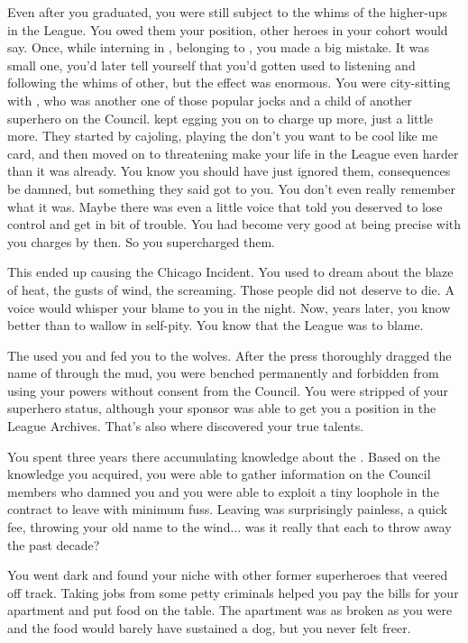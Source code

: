 \documentclass[char]{LRSguildcamp1}
\begin{document}
Even after you graduated, you were still subject to the whims of the higher-ups in the League. You owed them your position, other heroes in your cohort would say. Once, while interning in \pCityO{}, belonging to \cOS{\MYsupername}, you made a big mistake. It was small one, you'd later tell yourself that you'd gotten used to listening and following the whims of other, but the effect was enormous. You were city-sitting with  \cJuggernaut{}, who was another one of those popular jocks and a child of another superhero on the Council. \cJuggernaut{\They} kept egging you on to charge \cJuggernaut{\them} up more, just a little more. They started by cajoling, playing the don't you want to be cool like me card, and then moved on to threatening make your life in the League even harder than it was already. You know you should have just ignored them, consequences be damned, but something they said got to you. You don't even really remember what it was. Maybe there was even a little voice that told you \cJuggernaut{\they} deserved to lose control and get in bit of trouble. You had become very good at being precise with you charges by then. So you supercharged them.  

This ended up causing the Chicago Incident. You used to dream about the blaze of heat, the gusts of wind, the screaming. Those people did not deserve to die. A voice would whisper your blame to you in the night. Now, years later, you know better than to wallow in self-pity. You know that the League was to blame.  

The \cHeroLeague{} used you and fed you to the wolves. After the press thoroughly dragged the name of \cYSOldName{} through the mud, you were benched permanently and forbidden from using your powers without consent from the Council. You were stripped of your superhero status, although your sponsor was able to get you a position in the League Archives. That's also where discovered your true talents. 

You spent three years there accumulating knowledge about the \cHeroLeague{}. Based on the knowledge you acquired, you were able to gather information on the Council members who damned you and you were able to exploit a tiny loophole in the contract to leave with minimum fuss.  Leaving was surprisingly painless, a quick fee, throwing your old name to the wind... was it really that each to throw away the past decade?  

You went dark and found your niche with other former superheroes that veered off track. Taking jobs from some petty criminals helped you pay the bills for your apartment and put food on the table. The apartment was as broken as you were and the food would barely have sustained a dog, but you never felt freer. 
\end{document}
